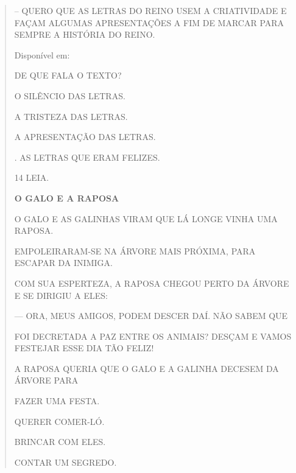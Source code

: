 \begin{escola}
{\begin{verse}
-- QUERO QUE AS LETRAS DO REINO USEM A CRIATIVIDADE E FAÇAM ALGUMAS
APRESENTAÇÕES A FIM DE MARCAR PARA SEMPRE A HISTÓRIA DO REINO.

Disponível em:

DE QUE FALA O TEXTO?

\begin{escolha}
\item O SILÊNCIO DAS LETRAS.

\item A TRISTEZA DAS LETRAS.

\item A APRESENTAÇÃO DAS LETRAS.

\item. AS LETRAS QUE ERAM FELIZES.
\end{escolha}


\num{14} LEIA.

\textbf{O GALO E A RAPOSA}

O GALO E AS GALINHAS VIRAM QUE LÁ LONGE VINHA UMA RAPOSA.

EMPOLEIRARAM-SE NA ÁRVORE MAIS PRÓXIMA, PARA ESCAPAR DA INIMIGA.

COM SUA ESPERTEZA, A RAPOSA CHEGOU PERTO DA ÁRVORE E
SE DIRIGIU A ELES:

--- ORA, MEUS AMIGOS, PODEM DESCER DAÍ. NÃO SABEM QUE

FOI DECRETADA A PAZ ENTRE OS ANIMAIS? DESÇAM E VAMOS FESTEJAR ESSE
DIA TÃO FELIZ!


A RAPOSA QUERIA QUE O GALO E A GALINHA DECESEM DA ÁRVORE PARA

\begin{escolha}
\item FAZER UMA FESTA.

\item QUERER COMER-LÓ.

\item BRINCAR COM ELES.

\item CONTAR UM SEGREDO.
\end{escolha}



\end{verse}}
\end{escola}
